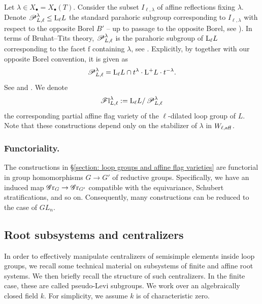 Let $\lambda \in X_{\bullet} = X_{\bullet}(T)$. Consider the subset $I_{\ell, \lambda}$ of affine reflections fixing $\lambda$. Denote $\operatorname{\mathscr{P}}^{\lambda}_{L, \ell} \leq \mathrm{L}_{\ell} L$ the standard parahoric subgroup corresponding to $I_{\ell, \lambda}$ with respect to the opposite Borel $B'$ -- up to passage to the opposite Borel, see \cite[\S 2.1.4]{BBSV22}).
In terms of Bruhat--Tits theory, $\operatorname{\mathscr{P}}^{\lambda}_{L, \ell}$ is the parahoric subgroup of $\mathrm{L}_{\ell} L$ corresponding to the facet $\mathrm{f}$ containing $\lambda$, see \cite{RW22}. 
Explicitly, by \cite[equation (2.8)]{BBSV22} together with our opposite Borel convention, it is given as
\begin{equation*}
    \operatorname{\mathscr{P}}^{\lambda}_{L, \ell} = \mathrm{L}_{\ell} L \cap t^{\lambda} \cdot \mathrm{L^+} L \cdot t^{-\lambda}.
\end{equation*}
See \cite[\S 4.2 -- \S 4.3]{RW22} and \cite[\S 2.1]{BBSV22}.
%
We denote 
\begin{equation*}
\operatorname{\mathscr{F}l}^{\lambda}_{L, \ell} := \mathrm{L}_{\ell} L / \operatorname{\mathscr{P}}^{\lambda}_{L, \ell}    
\end{equation*}
the corresponding partial affine flag variety of the $\ell$-dilated loop group of $L$.
Note that these constructions depend only on the stabilizer of $\lambda$ in $W_{\ell, \mathrm{aff}}$.


\subsubsection{Functoriality.}
The constructions in \S \ref{section: loop groups and affine flag varieties} are functorial in group homomorphisms $G \to G'$ of reductive groups. Specifically, we have an induced map $\operatorname{\mathscr{G}r}_{G} \to \operatorname{\mathscr{G}r}_{G'}$ compatible with the equivariance, Schubert stratifications, and so on. Consequently, many constructions can be reduced to the case of $GL_n$.



\subsection{Root subsystems and centralizers}\label{section: root subsystems and centralizers}
In order to effectively manipulate centralizers of semisimple elements inside loop groups, we recall some technical material on subsystems of finite and affine root systems. We then briefly recall the structure of such centralizers. In the finite case, these are called pseudo-Levi subgroups. 
We work over an algebraically closed field $k$. For simplicity, we assume $k$ is of characteristic zero.

